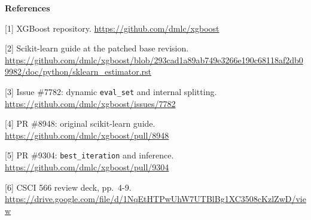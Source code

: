 \documentclass[10pt,letterpaper]{article}
\begin{document}
\textbf{References}

{[}1{]} XGBoost repository. \url{https://github.com/dmlc/xgboost}

{[}2{]} Scikit-learn guide at the patched base revision.
\url{https://github.com/dmlc/xgboost/blob/293cad1a89ab749e3266e190c68118af2db09982/doc/python/sklearn_estimator.rst}

{[}3{]} Issue \#7782: dynamic \texttt{eval\_set} and internal splitting.
\url{https://github.com/dmlc/xgboost/issues/7782}

{[}4{]} PR \#8948: original scikit-learn guide.
\url{https://github.com/dmlc/xgboost/pull/8948}

{[}5{]} PR \#9304: \texttt{best\_iteration} and inference.
\url{https://github.com/dmlc/xgboost/pull/9304}

{[}6{]} CSCI 566 review deck, pp.~4-9.
\url{https://drive.google.com/file/d/1NqEtHTPwUhW7UTBlBg1XC3508cKzlZwD/view}
\end{document}

